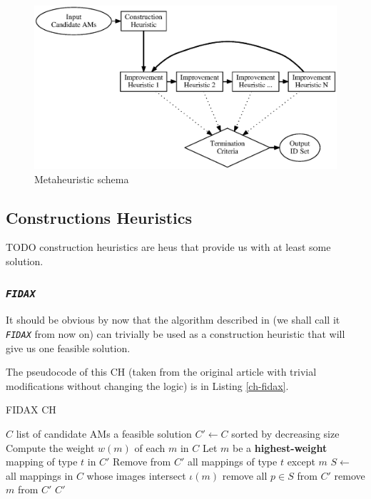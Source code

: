 \documentclass[a4paper,12pt,oneside]{report}
\newcommand{\jmodule}[1]{\texttt{\textit{#1}}}
\theoremstyle{definition}
\begin{document}
\begin{figure}
  \caption{Metaheuristic schema}
  \label{image-metaheuristic}
  \centering
    \includegraphics[width=\textwidth]{images/metaheuristic}
\end{figure}

\subsection{Constructions Heuristics}

TODO construction heuristics are heus that provide us with at least some solution.

\subsubsection{\jmodule{FIDAX}}

It should be obvious by now that the algorithm described in \cite{fidax} (we shall call it \jmodule{FIDAX} from now on) can trivially be used as a construction heuristic that will give us one feasible solution.

The pseudocode of this CH (taken from the original article with trivial modifications without changing the logic) is in Listing \ref{ch-fidax}.

\begin{algorithm}
\caption{FIDAX CH}
\label{ch-fidax}
\begin{algorithmic}
\REQUIRE $C$ list of candidate AMs
\ENSURE a feasible solution
\STATE $C' \gets C$ sorted by decreasing size
\STATE Compute the weight $w(m)$ of each $m$ in $C$
  \STATE Let $m$ be a \textbf{highest-weight} mapping of type $t$ in $C'$
  \STATE Remove from $C'$ all mappings of type $t$ except $m$
\ENDFOR
{}
  \STATE $S \gets$ all mappings in $C$ whose images intersect $\iota(m)$
    \STATE remove all $p \in S$ from $C'$
  \ELSE
    \STATE remove $m$ from $C'$
  \ENDIF
\ENDFOR
\RETURN $C'$
\end{algorithmic}
\end{algorithm}
\end{document}
